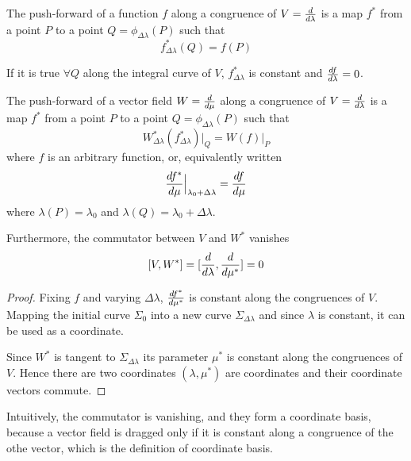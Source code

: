     \begin{definition}
        The push-forward of a function $f$ along a congruence of $V = \frac{d}{d\lambda}$ is a map $f^*$ from a point $P$ to a point $Q = \phi_{\Delta \lambda}(P) $ such that
        \begin{equation*}
            f^*_{\Delta \lambda} (Q) = f(P) 
        \end{equation*}
    \end{definition}
    If it is true $\forall Q$ along the integral curve of $V$, $f^*_{\Delta \lambda}$ is constant and $\frac{df}{d\lambda} = 0$.

    \begin{definition}
        The push-forward of a vector field $W = \frac{d}{d\mu}$ along a congruence of $V = \frac{d}{d\lambda}$ is a map $f^*$ from a point $P$ to a point $Q = \phi_{\Delta \lambda}(P) $ such that
        \begin{equation*}
            W^*_{\Delta \lambda} (f^*_{\Delta \lambda}) \vert_Q = W (f) \vert_P
        \end{equation*}
        where $f$ is an arbitrary function, or, equivalently written  
        \begin{equation*}
            \frac{df^*}{d\mu} \Big\vert_{\lambda_0 + \Delta \lambda} = \frac{df}{d\mu}
        \end{equation*}
        where $\lambda(P) = \lambda_0$ and $\lambda(Q) = \lambda_0 + \Delta \lambda$.
    \end{definition}
    
    Furthermore, the commutator between $V$ and $W^*$ vanishes
    \begin{equation}\label{comm}
        [V, W^*] = [\frac{d}{d\lambda}, \frac{d}{d\mu^*}] = 0
    \end{equation}

    \begin{proof}
        Fixing $f$ and varying $\Delta \lambda$, $\frac{df^*}{d\mu^*}$ is constant along the congruences of $V$. Mapping the initial curve $\Sigma_0$ into a new curve $\Sigma_{\Delta \lambda}$ and since $\lambda$ is constant, it can be used as a coordinate. 

        Since $W^*$ is tangent to $\Sigma_{\Delta \lambda}$ its parameter $\mu^*$ is constant along the congruences of $V$. Hence there are two coordinates $(\lambda, \mu^*)$ are coordinates and their coordinate vectors commute.
    \end{proof}

    Intuitively, the commutator is vanishing, and they form a coordinate basis, because a vector field is dragged only if it is constant along a congruence of the othe vector, which is the definition of coordinate basis.

